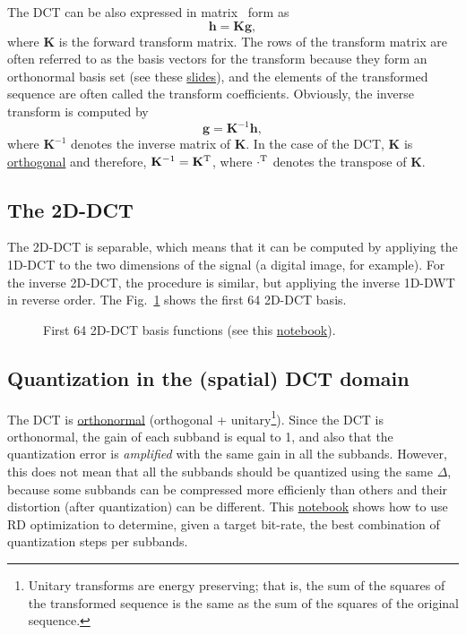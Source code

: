 The DCT can be also expressed in matrix~\cite{sayood2017introduction}
form as
\begin{equation}
  {\mathbf h} = {\mathbf K}{\mathbf g},
\end{equation}
where ${\mathbf K}$ is the forward transform matrix. The rows of the
transform matrix are often referred to as the basis vectors for the
transform because they form an orthonormal basis set (see these
\href{https://cseweb.ucsd.edu/classes/fa17/cse166-a/lec13.pdf}{slides}),
and the elements of the transformed sequence are often called the
transform coefficients. Obviously, the inverse transform is computed
by
\begin{equation}
  {\mathbf g} = {\mathbf K}^{-1}{\mathbf h},
\end{equation}
where ${\mathbf K}^{-1}$ denotes the inverse matrix of ${\mathbf
  K}$. In the case of the DCT, ${\mathbf K}$ is
\href{https://en.wikipedia.org/wiki/Orthogonal_matrix}{orthogonal} and
therefore, ${\mathbf K}^{-1}={\mathbf K}^{\text T}$, where
$\cdot^{\text T}$ denotes the transpose of ${\mathbf K}$.

\subsection{The 2D-DCT}

The 2D-DCT is separable, which means that it can be computed by
appliying the 1D-DCT to the two dimensions of the signal (a digital
image, for example). For the inverse 2D-DCT, the procedure is similar,
but appliying the inverse 1D-DWT in reverse order. The
Fig.~\ref{fig:2D-DCT_basis} shows the first 64 2D-DCT basis.

\begin{figure}
  \centering {} \caption{First 64 2D-DCT basis
  functions (see this
\href{https://github.com/Sistemas-Multimedia/Sistemas-Multimedia.github.io/blob/master/milestones/07-DCT/DCT_basis.ipynb}{notebook}).}
  \label{fig:2D-DCT_basis}
\end{figure}


\subsection{Quantization in the (spatial) DCT domain}

The DCT is
\href{https://en.wikipedia.org/wiki/Orthonormality}{orthonormal}
(orthogonal + unitary\footnote{Unitary transforms are energy
preserving; that is, the sum of the squares of the transformed
sequence is the same as the sum of the squares of the original
sequence.}). Since the DCT is orthonormal, the gain of each subband is
equal to 1, and also that the quantization error is \emph{amplified}
with the same gain in all the subbands. However, this does not mean
that all the subbands should be quantized using the same $\Delta$,
because some subbands can be compressed more efficienly than others
and their distortion (after quantization) can be different. This
\href{https://github.com/Sistemas-Multimedia/Sistemas-Multimedia.github.io/blob/master/milestones/07-DCT/block_DCT_compression.ipynb}{notebook}
shows how to use RD optimization to determine, given a target
bit-rate, the best combination of quantization steps per subbands.

